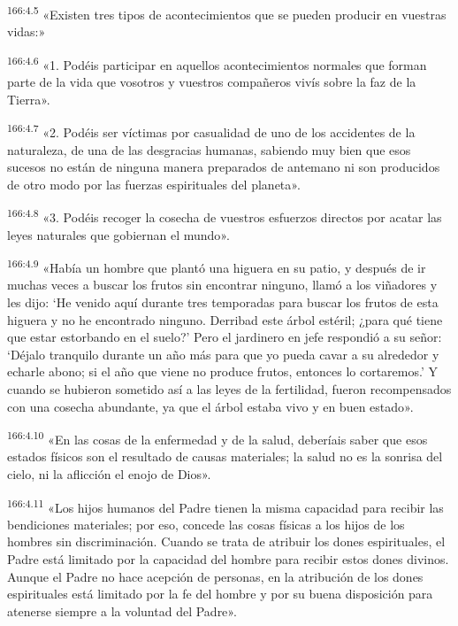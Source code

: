 \par 
\textsuperscript{166:4.5} «Existen tres tipos de acontecimientos que se pueden producir en vuestras vidas:»

\par 
\textsuperscript{166:4.6} «1. Podéis participar en aquellos acontecimientos normales que forman parte de la vida que vosotros y vuestros compañeros vivís sobre la faz de la Tierra».

\par 
\textsuperscript{166:4.7} «2. Podéis ser víctimas por casualidad de uno de los accidentes de la naturaleza, de una de las desgracias humanas, sabiendo muy bien que esos sucesos no están de ninguna manera preparados de antemano ni son producidos de otro modo por las fuerzas espirituales del planeta».

\par 
\textsuperscript{166:4.8} «3. Podéis recoger la cosecha de vuestros esfuerzos directos por acatar las leyes naturales que gobiernan el mundo».

\par 
\textsuperscript{166:4.9} «Había un hombre que plantó una higuera en su patio, y después de ir muchas veces a buscar los frutos sin encontrar ninguno, llamó a los viñadores y les dijo: `He venido aquí durante tres temporadas para buscar los frutos de esta higuera y no he encontrado ninguno. Derribad este árbol estéril; ¿para qué tiene que estar estorbando en el suelo?' Pero el jardinero en jefe respondió a su señor: `Déjalo tranquilo durante un año más para que yo pueda cavar a su alrededor y echarle abono; si el año que viene no produce frutos, entonces lo cortaremos.' Y cuando se hubieron sometido así a las leyes de la fertilidad, fueron recompensados con una cosecha abundante, ya que el árbol estaba vivo y en buen estado».

\par 
\textsuperscript{166:4.10} «En las cosas de la enfermedad y de la salud, deberíais saber que esos estados físicos son el resultado de causas materiales; la salud no es la sonrisa del cielo, ni la aflicción el enojo de Dios».

\par 
\textsuperscript{166:4.11} «Los hijos humanos del Padre tienen la misma capacidad para recibir las bendiciones materiales; por eso, concede las cosas físicas a los hijos de los hombres sin discriminación. Cuando se trata de atribuir los dones espirituales, el Padre está limitado por la capacidad del hombre para recibir estos dones divinos. Aunque el Padre no hace acepción de personas, en la atribución de los dones espirituales está limitado por la fe del hombre y por su buena disposición para atenerse siempre a la voluntad del Padre».

